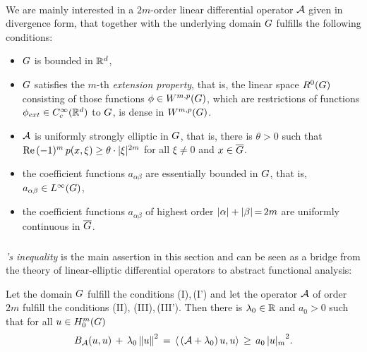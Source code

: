 \documentclass[11pt,twoside]{article}
\begin{document}
\paragraph*{}
We are mainly interested in a $2m$-order linear differential operator ${\mathcal{A}}$
given in divergence form,
that together with the underlying domain $G$ fulfills the following conditions:

\begin{itemize}[leftmargin=14mm]
\item[(I)\;\;]
$G$ is bounded in ${\mathbb{R}}^d$,

\item[(I')\;\,]
$G$ satisfies the $m$-th \textit{extension property},
that is,
the linear space $R^0(G)$ consisting of those functions $\phi \in W^{m,p}(G)$,
which are restrictions of functions $\phi_{ext} \in C_c^{\infty}({\mathbb{R}}^d)$ to $G$,
is dense in $W^{m,p}(G)$.

\item[(II)\;]
${\mathcal{A}}$ is uniformly strongly elliptic in $G$,
that is,
there is $\theta > 0$ %
such that
$\re \, (-1)^m \, p(x,\xi) \geq \theta \cdot \abs{\xi} ^{2m}$
for all $\xi \neq 0$ and $x \in \overline{G}$.

\item[(III)\,]
the coefficient functions $a_{\alpha \beta}$ are essentially bounded in $G$,
that is,
$a_{\alpha \beta} \in L^{\infty}(G)$,

\item[(III')]
the coefficient functions $a_{\alpha \beta}$ of highest order
$\abs{\alpha} + \abs{\beta} \eq 2m$ are uniformly continuous in $\overline{G}$.
\end{itemize}

\subparagraph*{}
\textsc{{\GARDING}}\textit{'s inequality} is the main assertion in this section
and can be seen as a bridge
from the theory of linear-elliptic differential operators
to abstract functional analysis:

\begin{theorem}\label{GARDING_INEQUALITY_THEOREM}
Let the domain $G$ fulfill the conditions (I),\,(I') 
and let the operator ${\mathcal{A}}$ of order $2m$
fulfill the conditions (II),\,\,(III),\,(III').
Then there is $\lambda_0 \in {\mathbb{R}}$ and $a_0 > 0$ such that
for all $u \in H_0^{m}(G)$
\begin{equation}\label{GARDING_INEQUALITY}
\DF_{\A}(u,u) \, + \, \lambda_0 \norm{u}^2
\, = \,
\scalar{\,(\A+\lambda_0)\,u}{u}
\, \geq \,
a_0 \, {\abs{u} _m}^2.
\end{equation}
\end{theorem}
\end{document}

